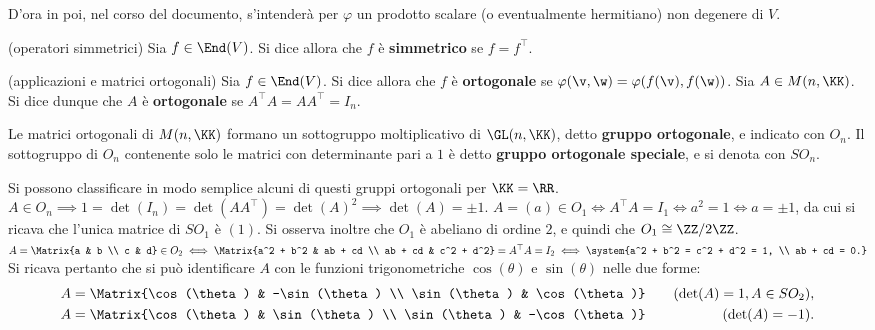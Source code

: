 \documentclass[11pt]{article}
\begin{document}
	\begin{note}
		D'ora in poi, nel corso del documento, s'intenderà per $\varphi$ un prodotto scalare (o eventualmente hermitiano) non degenere di $V$.
	\end{note}

	\begin{definition} (operatori simmetrici)
		Sia $f \in \End(V)$. Si dice allora che $f$ è \textbf{simmetrico} se $f = f^\top$.
	\end{definition}

	\begin{definition} (applicazioni e matrici ortogonali)
		Sia $f \in \End(V)$. Si dice allora che $f$ è \textbf{ortogonale} se $\varphi(\v, \w) = \varphi(f(\v), f(\w))$.
		Sia $A \in M(n, \KK)$. Si dice dunque che $A$ è \textbf{ortogonale} se $A^\top A = A A^\top = I_n$.
	\end{definition}

	\begin{definition}
		Le matrici ortogonali di $M(n, \KK)$ formano un sottogruppo moltiplicativo di $\GL(n, \KK)$, detto \textbf{gruppo ortogonale},
		e indicato con $O_n$. Il sottogruppo di $O_n$ contenente solo le matrici con determinante pari a $1$ è
		detto \textbf{gruppo ortogonale speciale}, e si denota con $SO_n$.
	\end{definition}

	\begin{remark}
		Si possono classificare in modo semplice alcuni di questi gruppi ortogonali per $\KK = \RR$. \\
		
		\li $A \in O_n \implies 1 = \det(I_n) = \det(A A^\top) = \det(A)^2 \implies \det(A) = \pm 1$.
		\li $A = (a) \in O_1 \iff A^\top A = I_1 \iff a^2 = 1 \iff a = \pm 1$, da cui si ricava che l'unica matrice
		di $SO_1$ è $(1)$. Si osserva inoltre che $O_1$ è abeliano di ordine $2$, e quindi che $O_1 \cong \ZZ/2\ZZ$. \\
		\li $A = \Matrix{a & b \\ c & d} \in O_2 \iff \Matrix{a^2 + b^2 & ab + cd \\ ab + cd & c^2 + d^2} = A^\top A = I_2 \iff \system{a^2 + b^2 = c^2 + d^2 = 1, \\ ab + cd = 0.}$ \\
		
		Si ricava pertanto che si può identificare
		$A$ con le funzioni trigonometriche $\cos(\theta)$ e $\sin(\theta)$ nelle due forme:
		\begin{align*}
			&A = \Matrix{\cos(\theta) & -\sin(\theta) \\ \sin(\theta) & \cos(\theta)} \quad &\text{(}\!\det(A) = 1, A \in SO_2\text{)}, \\
			&A = \Matrix{\cos(\theta) & \sin(\theta) \\ \sin(\theta) & -\cos(\theta)} \quad &\text{(}\!\det(A) = -1\text{)}.
		\end{align*}
	\end{remark}
\end{document}
